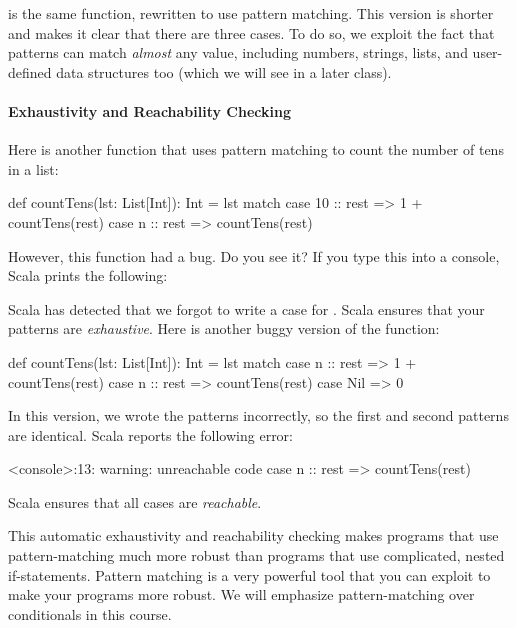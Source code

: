 \documentclass{book}
\begin{document}
is the same function, rewritten to use pattern matching. This version is shorter
and makes it clear that there are three cases. To do so, we exploit the fact
that patterns can match \emph{almost} any value, including numbers,
strings, lists, and user-defined data structures too (which we will see
in a later class).

\paragraph{Exhaustivity and Reachability Checking}
%
Here is another function that uses pattern matching to count the number
of tens in a list:
%
\begin{scalacode}
def countTens(lst: List[Int]): Int = lst match {
  case 10 :: rest => 1 + countTens(rest)
  case n :: rest => countTens(rest)
}
\end{scalacode}

However, this function had a bug. Do you see it? If you type this into
a console, Scala prints the following:
%
\begin{console}
<console>:10: warning: match may not be exhaustive.
It would fail on the following input: Nil
       def countTens(lst: List[Int]): Int = lst match {
                                            ^
\end{console}
%
Scala has detected that we forgot to write a case for .
Scala ensures that your patterns are \emph{exhaustive}. Here is another
buggy version of the function:
%
\begin{scalacode}
def countTens(lst: List[Int]): Int = lst match {
  case n :: rest => 1 + countTens(rest)
  case n :: rest => countTens(rest)
  case Nil => 0
}
\end{scalacode}
%
In this version, we wrote the patterns incorrectly, so the first and second
patterns are identical. Scala reports the following error:
\begin{scalacode}
<console>:13: warning: unreachable code
         case n :: rest => countTens(rest)
\end{scalacode}
%
Scala ensures that all cases are \emph{reachable}.

This automatic exhaustivity and reachability checking makes programs that
use pattern-matching much more robust than programs that use complicated,
nested if-statements. Pattern matching is a very powerful tool that you can
exploit to make your programs more robust. We will emphasize pattern-matching
over conditionals in this course.
\end{document}
